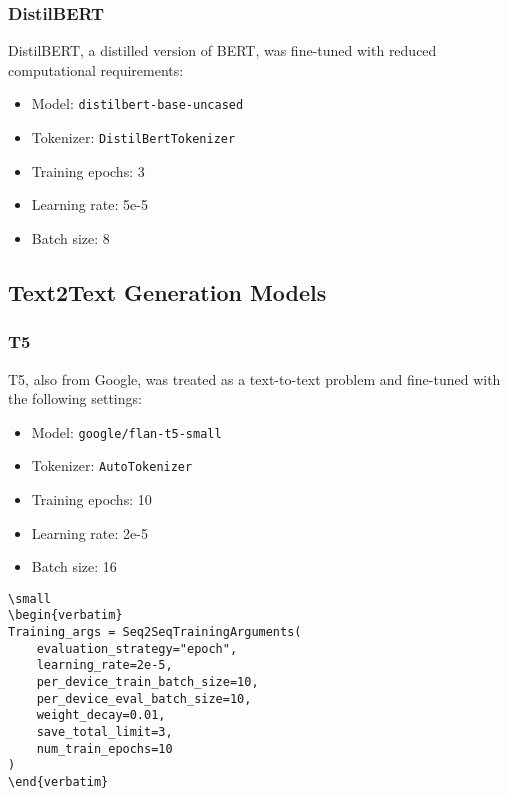 \documentclass[conference]{IEEEtran}
\begin{document}
        \subsubsection{DistilBERT}

            DistilBERT, a distilled version of BERT, was fine-tuned with reduced computational requirements:
            \begin{itemize}
                \item Model: \texttt{distilbert-base-uncased}
                \item Tokenizer: \texttt{DistilBertTokenizer}
                \item Training epochs: 3
                \item Learning rate: 5e-5
                \item Batch size: 8
            \end{itemize}

    \subsection{Text2Text Generation Models}

        \subsubsection{T5}

            T5, also from Google, was treated as a text-to-text problem and fine-tuned with the following settings:
            \begin{itemize}
                \item Model: \texttt{google/flan-t5-small}
                \item Tokenizer: \texttt{AutoTokenizer}
                \item Training epochs: 10
                \item Learning rate: 2e-5
                \item Batch size: 16
            \end{itemize}

\begin{tcolorbox}[linewidth=1pt, innerleftmargin=15pt, innerrightmargin=15pt, innertopmargin=15pt, innerbottommargin=15pt]
\begin{lstlisting}
\small
\begin{verbatim}
Training_args = Seq2SeqTrainingArguments(
    evaluation_strategy="epoch",
    learning_rate=2e-5,
    per_device_train_batch_size=10,
    per_device_eval_batch_size=10,
    weight_decay=0.01,
    save_total_limit=3,
    num_train_epochs=10
)
\end{verbatim}
\end{lstlisting}
\end{tcolorbox}
\end{document}
